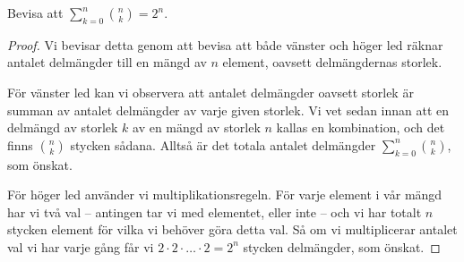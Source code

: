 \documentclass[nobib]{tufte-handout}
\begin{document}
\begin{example}\label{example_counting_all_subsets}
  Bevisa att $\sum_{k=0}^n \binom{n}{k} = 2^n$.

  \begin{proof}
    Vi bevisar detta genom att bevisa att både vänster och höger led räknar antalet delmängder till en mängd av $n$ element, oavsett delmängdernas storlek.

    För vänster led kan vi observera att antalet delmängder oavsett storlek är summan av antalet delmängder av varje given storlek. Vi vet sedan innan att en delmängd av storlek $k$ av en mängd av storlek $n$ kallas en kombination, och det finns $\binom{n}{k}$ stycken sådana. Alltså är det totala antalet delmängder $\sum_{k=0}^n \binom{n}{k}$, som önskat.

    För höger led använder vi multiplikationsregeln. För varje element i vår mängd har vi två val -- antingen tar vi med elementet, eller inte -- och vi har totalt $n$ stycken element för vilka vi behöver göra detta val. Så om vi multiplicerar antalet val vi har varje gång får vi $2\cdot2\cdot\ldots\cdot2 = 2^n$ stycken delmängder, som önskat.
  \end{proof}
\end{example}
\end{document}
